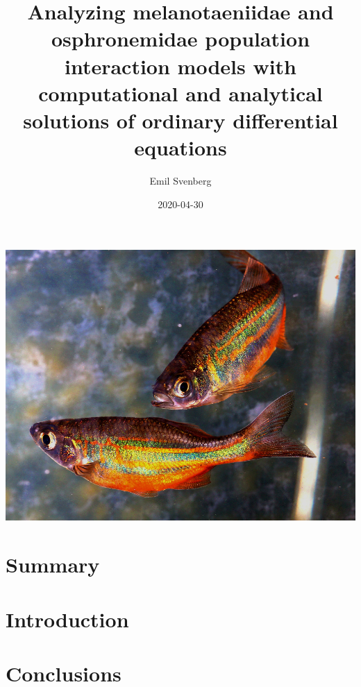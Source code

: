 \documentclass{article}
\title{Analyzing melanotaeniidae and osphronemidae population interaction models with computational 
and analytical solutions of ordinary differential equations}
\author{Emil Svenberg}
\date{2020-04-30}
\begin{document}
\maketitle
\begin{center}
    \includegraphics[scale=0.3]{../figures/rainbowfish.jpg}
\end{center}
\pagebreak
\tableofcontents
\pagebreak
\section*{Summary}


\section{Introduction}



\section{Conclusions}

\end{document}
